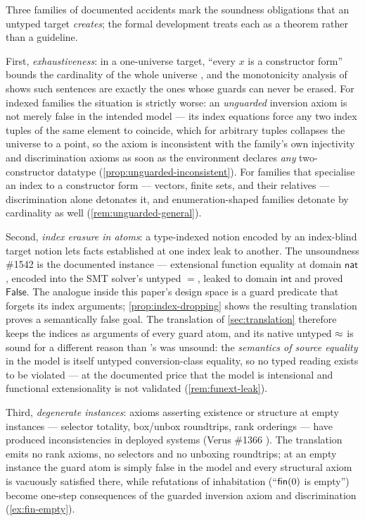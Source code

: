 Three families of documented accidents mark the soundness obligations
that an untyped target \emph{creates}; the formal development treats each
as a theorem rather than a guideline.

First, \emph{exhaustiveness}: in a one-universe target, ``every $x$ is a
constructor form'' bounds the cardinality of the whole universe
\cite[\S 2.3]{MengPaulson2008}, and the monotonicity analysis of
\cite{BlanchetteEtAl2016} shows such sentences are exactly the ones whose
guards can never be erased.  For indexed families the situation is
strictly worse: an \emph{unguarded} inversion axiom is not merely
false in the intended model --- its index equations force any two
index tuples of the same element to coincide, which for arbitrary
tuples collapses the universe to a point, so the axiom is inconsistent
with the family's own injectivity and discrimination axioms as soon as
the environment declares \emph{any} two-constructor datatype
(\cref{prop:unguarded-inconsistent}).  For families that specialise an
index to a constructor form --- vectors, finite sets, and their
relatives --- discrimination alone detonates it, and
enumeration-shaped families detonate by cardinality as well
(\cref{rem:unguarded-general}).

Second, \emph{index erasure in atoms}: a type-indexed notion encoded by
an index-blind target notion lets facts established at one index leak to
another.  The \fstar{} unsoundness \#1542 \cite{FStar1542} is the
documented instance --- extensional function equality at domain
$\mathsf{nat}$, encoded into the SMT solver's untyped $=$, leaked to
domain $\mathsf{int}$ and proved $\mathsf{False}$.  The analogue inside
this paper's design space is a guard predicate that forgets its index
arguments; \cref{prop:index-dropping} shows the resulting translation
proves a semantically false goal.  The translation of
\cref{sec:translation} therefore keeps the indices as arguments of every
guard atom, and its native untyped $\approx$ is sound for a different reason
than \fstar{}'s was unsound: the \emph{semantics of source equality} in
the model is itself untyped conversion-class equality, so no typed
reading exists to be violated --- at the documented price that the model
is intensional and functional extensionality is not validated
(\cref{rem:funext-leak}).

Third, \emph{degenerate instances}: axioms asserting existence or
structure at empty instances --- selector totality, box/unbox roundtrips,
rank orderings --- have produced inconsistencies in deployed systems
(Verus \#1366 \cite{Verus1366}).  The translation emits no rank axioms,
no selectors and no unboxing roundtrips; at an empty instance the guard
atom is simply false in the model and every structural axiom is
vacuously satisfied there, while refutations of inhabitation
(``$\mathsf{fin}(0)$ is empty'') become one-step consequences of the guarded
inversion axiom and discrimination (\cref{ex:fin-empty}).
